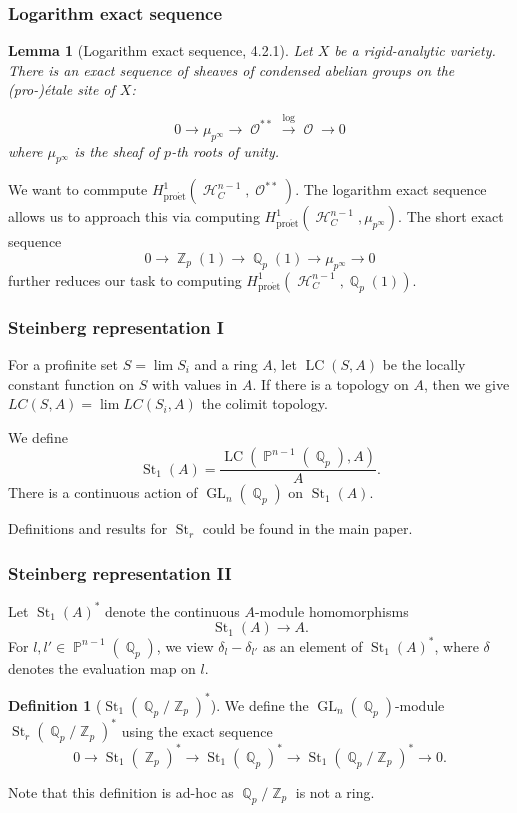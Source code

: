 \documentclass{beamer}
\newtheorem{lem}[thm]{Lemma}
\theoremstyle{definition}
\newtheorem{defn}[thm]{Definition}
\newcommand{\LC}{\operatorname{LC}}
\newcommand{\pet}{\operatorname{pro\acute{e}t}}
\newcommand{\St}{\operatorname{St}}
\newcommand{\GL}{\operatorname{GL}}
\newcommand{\OO}{\operatorname{\mathcal{O}}}
\newcommand{\ZZ}{\operatorname{\mathbb{Z}}}
\newcommand{\QQ}{\operatorname{\mathbb{Q}}}
\newcommand{\PP}{\operatorname{\mathbb{P}}}
\newcommand{\HH}{\operatorname{\mathcal{H}}}
\begin{document}
\begin{frame}
\frametitle{Logarithm exact sequence}
\begin{lem}[Logarithm exact sequence, \cite{24} 4.2.1] Let $X$ be a rigid-analytic variety. There is an exact sequence of sheaves of condensed abelian groups on the (pro-)\'etale site of $X$:

\begin{equation} \label{Loges}
	0 \to \mu_{p^{\infty}} \to \OO^{**} \xrightarrow{\log} \OO \to 0
\end{equation}
where $\mu_{p^{\infty}}$ is the sheaf of $p$-th roots of unity. 
\end{lem}
We want to commpute $H_{\pet}^1(\HH_C^{n - 1}, \OO^{**})$. The logarithm exact sequence allows us to approach this via computing $H_{\pet}^1(\HH_C^{n - 1}, \mu_{p^{\infty}})$. The short exact sequence $$0 \to \ZZ_p(1) \to \QQ_p(1) \to \mu_{p^\infty} \to 0$$ further reduces our task to computing $H_{\pet}^1(\HH_C^{n - 1}, \QQ_p(1))$.
\end{frame}

\begin{frame}
\frametitle{Steinberg representation I}
For a profinite set $S = \lim S_i$ and a ring $A$, let $\LC(S, A)$ be the locally constant function on $S$ with values in $A$. If there is a topology on $A$, then we give $LC(S, A) = \lim LC(S_i, A)$ the colimit topology. 

\begin{definition} We define
	$$\St_1(A) = \frac{\LC(\PP^{n - 1}(\QQ_p), A)}{A}.$$ There is a continuous action of $\GL_n(\QQ_p)$ on $\St_1(A)$.
\end{definition}
Definitions and results for $\St_r$ could be found in the main paper.
\end{frame}

\begin{frame}
\frametitle{Steinberg representation II}
Let $\St_1(A)^*$ denote the continuous $A$-module homomorphisms $$\St_1(A) \to A.$$ For $l, l' \in \PP^{n - 1}(\QQ_p)$, we view $\delta_l - \delta_{l'}$ as an element of $\St_1(A)^*$, where $\delta$ denotes the evaluation map on $l$.

\begin{defn}[$\St_1(\QQ_p/\ZZ_p)^*$]
	We define the $\GL_n(\QQ_p)$-module $\St_r(\QQ_p/\ZZ_p)^*$ using the exact sequence 
	\begin{equation}\label{steinQZ}
	0 \to \St_1(\ZZ_p)^* \to \St_1(\QQ_p)^* \to \St_1(\QQ_p/\ZZ_p)^* \to 0.
	\end{equation}
	\end{defn}

Note that this definition is ad-hoc as $\QQ_p/\ZZ_p$ is not a ring.

\end{frame}
\end{document}
